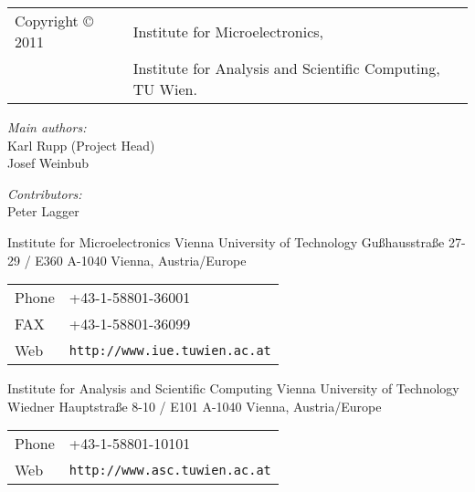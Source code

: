 
\clearpage

\begin{tabular}{ll}
Copyright {\copyright} 2011 & Institute for Microelectronics, \\
                            & Institute for Analysis and Scientific Computing, TU Wien.
\end{tabular}

\vspace{3.5cm}

\textit{Main authors:}\\ 

Karl Rupp (Project Head)\\
Josef Weinbub \\

\vspace{1cm}

\textit{Contributors:}\\ 

Peter Lagger


\vspace{3.5cm}

Institute for Microelectronics\newline
Vienna University of Technology\newline
Gu\ss hausstra\ss e 27-29 / E360\newline
A-1040 Vienna, Austria/Europe\newline

\begin{tabular}{ll}
Phone  & +43-1-58801-36001\\
FAX    & +43-1-58801-36099\\
Web    & \texttt{http://www.iue.tuwien.ac.at}
\end{tabular}

\vspace{1.5cm}

Institute for Analysis and Scientific Computing\newline
Vienna University of Technology\newline
Wiedner Hauptstra\ss e 8-10 / E101\newline
A-1040 Vienna, Austria/Europe\newline

\begin{tabular}{ll}
Phone  & +43-1-58801-10101\\
Web    & \texttt{http://www.asc.tuwien.ac.at}
\end{tabular}





